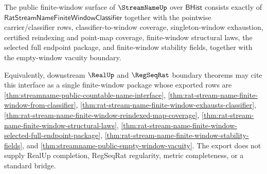 \begin{theorem}
\label{thm:streamname-public-finite-window-interface}
The public finite-window surface of $\StreamNameUp$ over $\mathsf{BHist}$
consists exactly of
$\mathsf{RatStreamNameFiniteWindowClassifier}$ together with the pointwise
carrier/classifier rows, classifier-to-window coverage, singleton-window
exhaustion, certified reindexing and point-map coverage, finite-window
structural laws, the selected full endpoint package, and finite-window
stability fields, together with the empty-window vacuity boundary.

Equivalently, downstream $\RealUp$ and $\RegSeqRat$ boundary theorems may cite
this interface as a single finite-window package whose exported rows are
\autoref{thm:streamname-public-countable-name-interface},
\autoref{thm:rat-stream-name-finite-window-from-classifier},
\autoref{thm:rat-stream-name-finite-window-exhausts-classifier},
\autoref{thm:rat-stream-name-finite-window-reindexed-map-coverage},
\autoref{thm:rat-stream-name-finite-window-structural-laws},
\autoref{thm:rat-stream-name-finite-window-selected-full-endpoint-package},
\autoref{thm:rat-stream-name-finite-window-stability-fields}, and
\autoref{thm:streamname-public-empty-window-vacuity}.  The export does not
supply RealUp completion, RegSeqRat regularity, metric completeness, or a
standard bridge.
\end{theorem}

